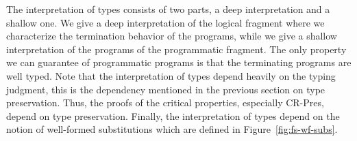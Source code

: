 The interpretation of types consists of two parts, a deep
interpretation and a shallow one.  We give a deep interpretation of
the logical fragment where we characterize the termination behavior of
the programs, while we give a shallow interpretation of the programs
of the programmatic fragment.  The only property we can guarantee of
programmatic programs is that the terminating programs are well typed.
Note that the interpretation of types depend heavily on the typing
judgment, this is the dependency mentioned in the previous section on
type preservation.  Thus, the proofs of the critical properties,
especially CR-Pres, depend on type preservation.  Finally, the
interpretation of types depend on the notion of well-formed
substitutions which are defined in Figure~\ref{fig:fs-wf-subs}.

